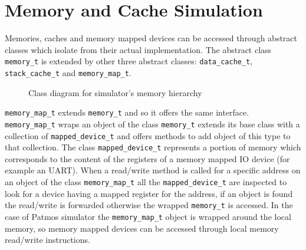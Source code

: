 \section{Memory and Cache Simulation}

Memories, caches and memory mapped devices can be accessed through abstract classes which isolate from their actual implementation. The abstract class \texttt{memory\_t} is extended by other three abstract classes: \texttt{data\_cache\_t}, \texttt{stack\_cache\_t} and \texttt{memory\_map\_t}.

	\begin{figure}[!ht]
		\begin{center}
		\end{center}
		\caption{Class diagram for simulator's memory hierarchy}
		\label{memory_hierarchy}
	\end{figure}

\texttt{memory\_map\_t} extends \texttt{memory\_t} and so it offers the same interface. \texttt{memory\_map\allowbreak \_t} wraps an object of the class \texttt{memory\_t} extends its base class with a collection of \texttt{mapped\_device\_t} and offers methods to add object of this type to that collection. The class \texttt{mapped\_device\_t} represents a portion of memory which corresponds to the content of the registers of a memory mapped IO device (for example an UART). When a read/write method is called for a specific address on an object of the class \texttt{memory\_map\_t} all the \texttt{mapped\_device\_t} are inspected to look for a device having a mapped register for the address, if an object is found the read/write is forwarded otherwise the wrapped \texttt{memory\_t} is accessed. In the case of Patmos simulator the \texttt{memory\_map\_t} object is wrapped around the local memory, so memory mapped devices can be accessed through local memory read/write instructions.

